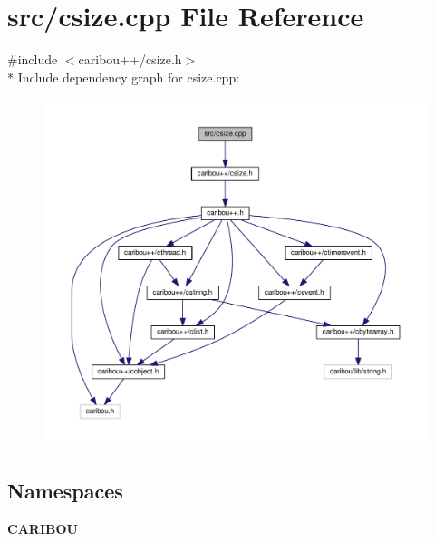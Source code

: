 \section{src/csize.cpp File Reference}
\label{csize_8cpp}
{\ttfamily \#include $<$caribou++/csize.\-h$>$}\\*
Include dependency graph for csize.\-cpp\-:\nopagebreak
\begin{figure}[H]
\begin{center}
\leavevmode
\includegraphics[width=350pt]{csize_8cpp__incl}
\end{center}
\end{figure}
\subsection*{Namespaces}
\begin{DoxyCompactItemize}
\item 
{\bf C\-A\-R\-I\-B\-O\-U}
\end{DoxyCompactItemize}
